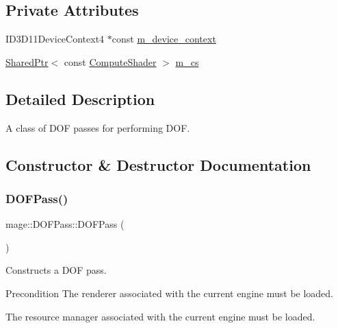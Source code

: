 \subsection*{Private Attributes}
\begin{DoxyCompactItemize}
\item 
I\+D3\+D11\+Device\+Context4 $\ast$const \hyperlink{classmage_1_1_d_o_f_pass_a4f0255efe5c79a597462c1535675290e}{m\+\_\+device\+\_\+context}
\item 
\hyperlink{namespacemage_a1e01ae66713838a7a67d30e44c67703e}{Shared\+Ptr}$<$ const \hyperlink{namespacemage_ae040329401484b076f0cd1a7c43d19c9}{Compute\+Shader} $>$ \hyperlink{classmage_1_1_d_o_f_pass_a4fdc59697e57d5174a3a859f528c4d17}{m\+\_\+cs}
\end{DoxyCompactItemize}


\subsection{Detailed Description}
A class of D\+OF passes for performing D\+OF. 

\subsection{Constructor \& Destructor Documentation}
\hypertarget{classmage_1_1_d_o_f_pass_a11dccae5f2613da112845158f69727e7}{}\label{classmage_1_1_d_o_f_pass_a11dccae5f2613da112845158f69727e7} 
\subsubsection{\texorpdfstring{D\+O\+F\+Pass()}{DOFPass()}\hspace{0.1cm}{\footnotesize\ttfamily [1/3]}}
{\footnotesize\ttfamily mage\+::\+D\+O\+F\+Pass\+::\+D\+O\+F\+Pass (\begin{DoxyParamCaption}{ }\end{DoxyParamCaption})}

Constructs a D\+OF pass.

\begin{DoxyPrecond}{Precondition}
The renderer associated with the current engine must be loaded. 

The resource manager associated with the current engine must be loaded. 
\end{DoxyPrecond}
\hypertarget{classmage_1_1_d_o_f_pass_a481180bac0436c5e3f627fcd810e699c}{}\label{classmage_1_1_d_o_f_pass_a481180bac0436c5e3f627fcd810e699c} 

